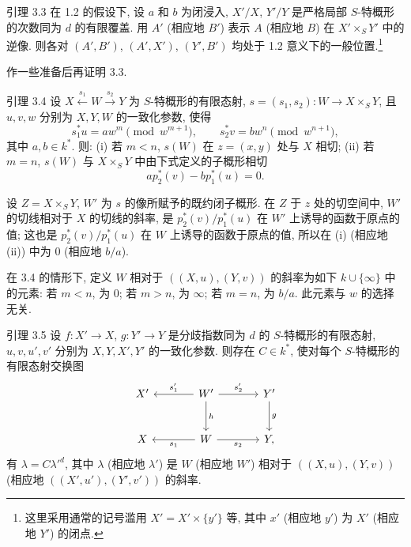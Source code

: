 \begin{statement}{引理 3.3}
在 1.2 的假设下, 设 $a$ 和 $b$ 为闭浸入, $X'/X$, $Y'/Y$ 是严格局部 $S$-特概形的次数同为 $d$ 的有限覆盖. 用 $A'$ (相应地 $B'$) 表示 $A$ (相应地 $B$) 在 $X'\times_S Y'$ 中的逆像. 则各对 $(A',B')$, $(A',X')$, $(Y',B')$ 均处于 1.2 意义下的一般位置.\footnote{这里采用通常的记号滥用 $X'=X'\times\{y'\}$ 等, 其中 $x'$ (相应地 $y'$) 为 $X'$ (相应地 $Y'$) 的闭点.}
\end{statement}

作一些准备后再证明 3.3.

\begin{statement}{引理 3.4}
设 $X\xleftarrow{s_1}W\xrightarrow{s_2}Y$ 为 $S$-特概形的有限态射, $s=(s_1,s_2):W\to X\times_SY$, 且 $u,v,w$ 分别为 $X,Y,W$ 的一致化参数, 使得
\[
s_1^*u=aw^m\pmod {w^{m+1}},\qquad
s_2^*v=bw^n\pmod {w^{n+1}},
\]
其中 $a,b\in k^*$. 则: (i) 若 $m<n$, $s(W)$ 在 $z=(x,y)$ 处与 $X$ 相切; (ii) 若 $m=n$, $s(W)$ 与 $X\times_SY$ 中由下式定义的子概形相切
\[
ap_2^*(v)-bp_1^*(u)=0.
\]
\end{statement}

设 $Z=X\times_SY$, $W'$ 为 $s$ 的像所赋予的既约闭子概形. 在 $Z$ 于 $z$ 处的切空间中, $W'$ 的切线相对于 $X$ 的切线的斜率, 是 $p_2^*(v)/p_1^*(u)$ 在 $W'$ 上诱导的函数于原点的值; 这也是 $p_2^*(v)/p_1^*(u)$ 在 $W$ 上诱导的函数于原点的值, 所以在 (i) (相应地 (ii)) 中为 $0$ (相应地 $b/a$).

在 3.4 的情形下, 定义 $W$ 相对于 $((X,u),(Y,v))$ 的斜率为如下 $k\cup\{\infty\}$ 中的元素: 若 $m<n$, 为 $0$; 若 $m>n$, 为 $\infty$; 若 $m=n$, 为 $b/a$. 此元素与 $w$ 的选择无关.

\begin{statement}{引理 3.5}
设 $f:X'\to X$, $g:Y'\to Y$ 是分歧指数同为 $d$ 的 $S$-特概形的有限态射, $u,v,u',v'$ 分别为 $X,Y,X',Y'$ 的一致化参数. 则存在 $C\in k^*$, 使对每个 $S$-特概形的有限态射交换图
\[
\begin{tikzcd}[column sep=large,row sep=large]
X' & W' \arrow[l,"s'_1"'] \arrow[r,"s'_2"] \arrow[d,"h"] & Y' \arrow[d,"g"]\\
X & W \arrow[l,"s_1"] \arrow[r,"s_2"'] & Y ,
\end{tikzcd}
\]
有 $\lambda=\allowbreak C{\lambda'}^d$, 其中 $\lambda$ (相应地 $\lambda'$) 是 $W$ (相应地 $W'$) 相对于 $((X,u),(Y,v))$ (相应地 $((X',u'),(Y',v'))$ 的斜率.
\end{statement}

